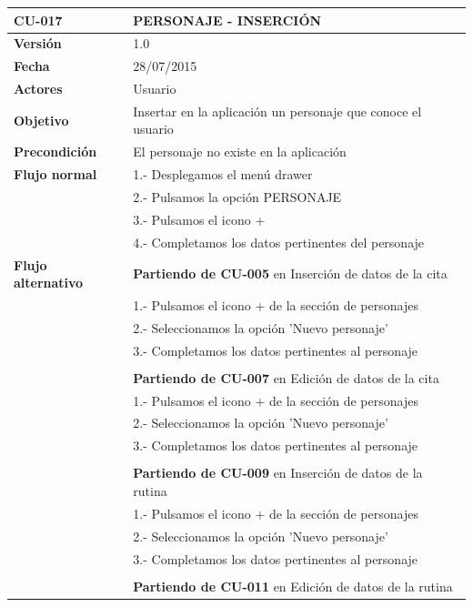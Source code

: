 \documentclass[../pfc.tex]{subfiles}
\begin{document}
		\begin{table}[H]
			\centering
			\begin{tabular}[t]{|p{3cm}|p{9.5cm}|}
				\hline \textbf{CU-017} & \textbf{PERSONAJE - INSERCIÓN} \\*
				\hline\hline \textbf{Versión} & 1.0 \\*
				\hline\hline \textbf{Fecha} & 28/07/2015 \\*
				\hline\textbf{Actores} 	& Usuario\\*
				\hline \textbf{Objetivo} & Insertar en la aplicación un personaje que conoce el usuario\\* 			
				\hline \textbf{Precondición} & El personaje no existe en la aplicación\\* 
				\hline \textbf{Flujo normal} & 1.- Desplegamos el menú drawer \\* 
				& 2.- Pulsamos la opción PERSONAJE\\*	
				& 3.- Pulsamos el icono +\\*	
				& 4.- Completamos los datos pertinentes del personaje\\*	
				\hline \textbf{Flujo alternativo} & \textbf{Partiendo de CU-005} en Inserción de datos de la cita\\* 
				& 1.- Pulsamos el icono + de la sección de personajes\\*	
				& 2.- Seleccionamos la opción 'Nuevo personaje'\\*
				& 3.- Completamos los datos pertinentes al personaje\\*
				& \\*
				& \textbf{Partiendo de CU-007} en Edición de datos de la cita\\* 
				& 1.- Pulsamos el icono + de la sección de personajes\\*	
				& 2.- Seleccionamos la opción 'Nuevo personaje'\\*
				& 3.- Completamos los datos pertinentes al personaje\\*
				& \\*
				& \textbf{Partiendo de CU-009} en Inserción de datos de la rutina\\* 
				& 1.- Pulsamos el icono + de la sección de personajes\\*	
				& 2.- Seleccionamos la opción 'Nuevo personaje'\\*
				& 3.- Completamos los datos pertinentes al personaje\\*
				& \\*
				& \textbf{Partiendo de CU-011} en Edición de datos de la rutina\\* 

\end{tabular}
\end{table}
\end{document}
